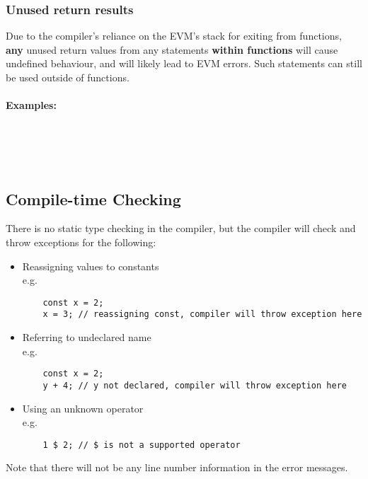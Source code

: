 \subsubsection{Unused return results}
Due to the compiler's reliance on the EVM's stack for exiting from functions, \textbf{any} unused return values from any statements \textbf{within functions} will cause undefined behaviour, and will likely lead to EVM errors. Such statements can still be used outside of functions. 
\\\\
\textbf{Examples:} \\\\
\\
\\
\\

\subsection{Compile-time Checking}
There is no static type checking in the compiler, but the compiler will check and throw exceptions for the following: 
\begin{itemize}
\item Reassigning values to constants\\
e.g.
\begin{verbatim}
    const x = 2;
    x = 3; // reassigning const, compiler will throw exception here
\end{verbatim}
\item Referring to undeclared name\\
e.g.
\begin{verbatim}
    const x = 2;
    y + 4; // y not declared, compiler will throw exception here
\end{verbatim}

\item Using an unknown operator\\
e.g.
\begin{verbatim}
    1 $ 2; // $ is not a supported operator
\end{verbatim}

\end{itemize}
Note that there will not be any line number information in the error messages. 

